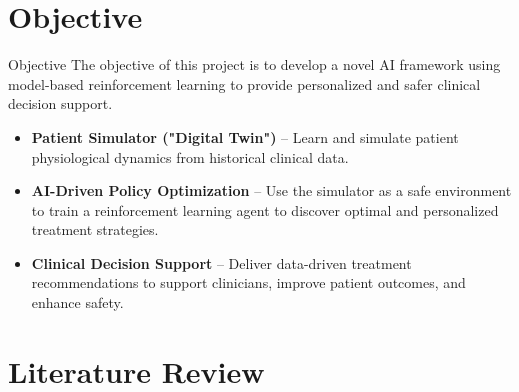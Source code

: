 \documentclass[11pt]{beamer}
\begin{document}
\section{Objective}
\begin{frame}{Objective}
The objective of this project is to develop a novel AI framework using model-based reinforcement learning to provide personalized and safer clinical decision support.

\begin{itemize}
    \item \textbf{Patient Simulator ("Digital Twin")} – Learn and simulate patient physiological dynamics from historical clinical data.
    \item \textbf{AI-Driven Policy Optimization} – Use the simulator as a safe environment to train a reinforcement learning agent to discover optimal and personalized treatment strategies.
    \item \textbf{Clinical Decision Support} – Deliver data-driven treatment recommendations to support clinicians, improve patient outcomes, and enhance safety.
\end{itemize}
\end{frame}



\section{Literature Review}
\end{document}
